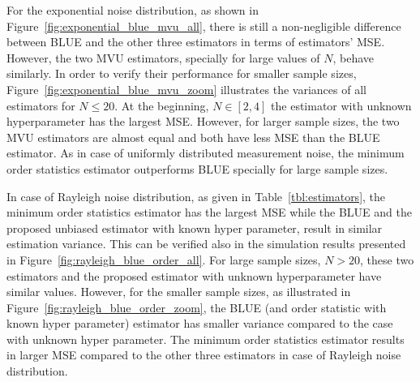 \documentclass{article}
\begin{document}
%
%
For the exponential noise distribution, as shown in Figure~\ref{fig:exponential_blue_mvu_all}, there is still a non-negligible difference between BLUE and the other three estimators in terms of estimators' MSE. However, the two MVU estimators, specially for large values of $N$, behave similarly. In order to verify their performance for smaller sample sizes, Figure~\ref{fig:exponential_blue_mvu_zoom}  illustrates the  variances of all estimators for $N\leq 20$. At the beginning, $N\in[2,4]$ the estimator with unknown hyperparameter has the largest MSE. However, for larger sample sizes, the two MVU estimators are almost equal and both have less MSE than the BLUE estimator. As in case of uniformly distributed measurement noise, the minimum order statistics estimator outperforms BLUE specially for large sample sizes.


In case of Rayleigh noise distribution, as given in Table~\ref{tbl:estimators}, the minimum order statistics estimator has the largest MSE while the BLUE and the proposed unbiased estimator with known hyper parameter, result in similar estimation variance. This can be verified also in the simulation results presented in Figure~\ref{fig:rayleigh_blue_order_all}. For large sample sizes, $N>20$, these two estimators and the proposed estimator with unknown hyperparameter  have similar values. However, for the smaller sample sizes,  as illustrated in Figure~\ref{fig:rayleigh_blue_order_zoom}, the BLUE (and order statistic with known hyper parameter) estimator has smaller variance compared to the case with unknown hyper parameter. The minimum order statistics estimator results in larger MSE compared to the other three estimators in case of Rayleigh noise distribution.
\end{document}
